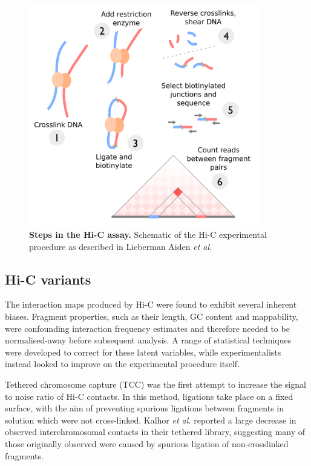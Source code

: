 \documentclass[a4paper,11pt,oneside]{book}
\begin{document}
\begin{figure}
\begin{center}
\includegraphics[width=4in]{figs/hic.png}
\captionsetup{width=\textwidth}
\caption[Steps in the Hi-C assay.]{ {\bf Steps in the Hi-C assay. } 
  Schematic of the Hi-C experimental procedure as described in Lieberman Aiden \emph{et al.}\cite{Lieberman2009}
}\label{fig:hicmethod}
\end{center}
\end{figure} 

\subsection{Hi-C variants}\label{sec:hicvar}

The interaction maps produced by Hi-C were found to exhibit several inherent biases. Fragment properties, such as their length, GC content and mappability, were confounding interaction frequency estimates and therefore needed to be normalised-away before subsequent analysis.\cite{Yaffe2011, Hu2013} A range of statistical techniques were developed to correct for these latent variables,\cite{Imakaev2012, Dekker2013, Hu2012, Li2014} while experimentalists instead looked to improve on the experimental procedure itself.

Tethered chromosome capture (TCC)\cite{Kalhor2012} was the first attempt to increase the signal to noise ratio of Hi-C contacts. In this method, ligations take place on a fixed surface, with the aim of preventing spurious ligations between fragments in solution which were not cross-linked. Kalhor \emph{et al.}\cite{Kalhor2012} reported a large decrease in observed interchromosomal contacts in their tethered library, suggesting many of those originally observed were caused by spurious ligation of non-crosslinked fragments.
\end{document}
